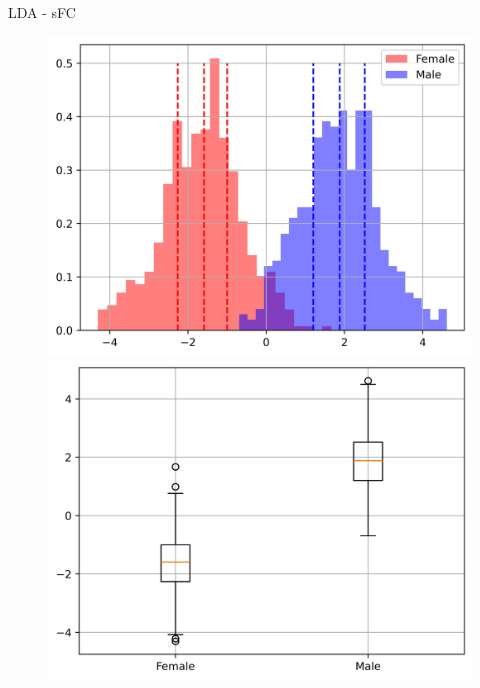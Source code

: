 \documentclass{beamer}
\begin{document}
\begin{frame}{LDA - sFC}
\begin{figure}[H]
{\begin{minipage}[b]{0.3\textwidth}
                \includegraphics[width=1\textwidth]{../Analysis/LDA/node=25_size=4800_step=4800_rho=0.1/hist_0.jpg}
                \includegraphics[width=1\textwidth]{../Analysis/LDA/node=25_size=4800_step=4800_rho=0.1/box_0.jpg}
            \end{minipage}
        }
\end{figure}
\end{frame}
\end{document}
